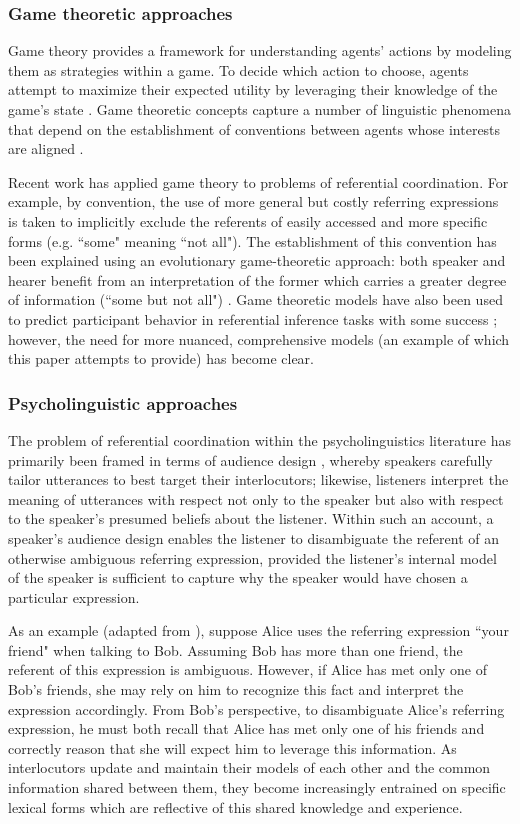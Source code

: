 \documentclass[a4paper,11pt]{article}
\begin{document}
\subsubsection{Game theoretic approaches}
Game theory provides a framework for understanding agents' actions by modeling them as strategies within a game. To decide which action to choose, agents attempt to maximize their expected utility by leveraging their knowledge of the game's state \cite{benz2005}. Game theoretic concepts capture a number of linguistic phenomena that depend on the establishment of conventions between agents whose interests are aligned \cite{lewis1969}.

Recent work has applied game theory to problems of referential coordination. For example, by convention, the use of more general but costly referring expressions is taken to implicitly exclude the referents of easily accessed and more specific forms (e.g. ``some" meaning ``not all"). The establishment of this convention has been explained using an evolutionary game-theoretic approach: both speaker and hearer benefit from an interpretation of the former which carries a greater degree of information (``some but not all") \cite{benz2005}. Game theoretic models have also been used to predict participant behavior in referential inference tasks with some success \cite{degen2012}; however, the need for more nuanced, comprehensive models (an example of which this paper attempts to provide) has become clear. 

\subsubsection{Psycholinguistic approaches}
The problem of referential coordination within the psycholinguistics literature has primarily been framed in terms of audience design \cite{clark1982}, whereby speakers carefully tailor utterances to best target their interlocutors; likewise, listeners interpret the meaning of utterances with respect not only to the speaker but also with respect to the speaker's presumed beliefs about the listener. Within such an account, a speaker's audience design enables the listener to disambiguate the referent of an otherwise ambiguous referring expression, provided the listener's internal model of the speaker is sufficient to capture why the speaker would have chosen a particular expression. 

As an example (adapted from \citeauthor{clark1982}), suppose Alice uses the referring expression ``your friend" when talking to Bob. Assuming Bob has more than one friend, the referent of this expression is ambiguous. However, if Alice has met only one of Bob's friends, she may rely on him to recognize this fact and interpret the expression accordingly. From Bob's perspective, to disambiguate Alice's referring expression, he must both recall that Alice has met only one of his friends and correctly reason that she will expect him to leverage this information. As interlocutors update and maintain their models of each other and the common information shared between them, they become increasingly entrained on specific lexical forms which are reflective of this shared knowledge and experience.
\end{document}
